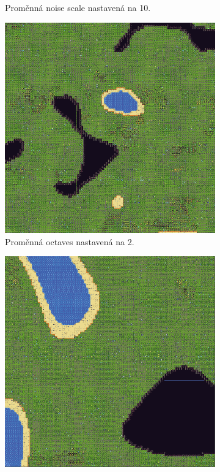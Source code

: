 \begin{figure}[H]
\begin{subfigure}{0.475\textwidth}
		\caption{Proměnná noise scale nastavená na 10.}
		\label{NoiseScale10}
	\end{subfigure}
	\begin{subfigure}{0.475\textwidth}
		\centering
		\includegraphics[scale=0.52]{obrazky-figures/NoiseOctaves2.png}
		\caption{Proměnná octaves nastavená na 2.}
		\label{NoiseOctaves}
	\end{subfigure}
	\begin{subfigure}{0.475\textwidth}
		\centering
		\includegraphics[scale=0.435]{obrazky-figures/NoiseSeed1.png}

\end{subfigure}
\end{figure}
